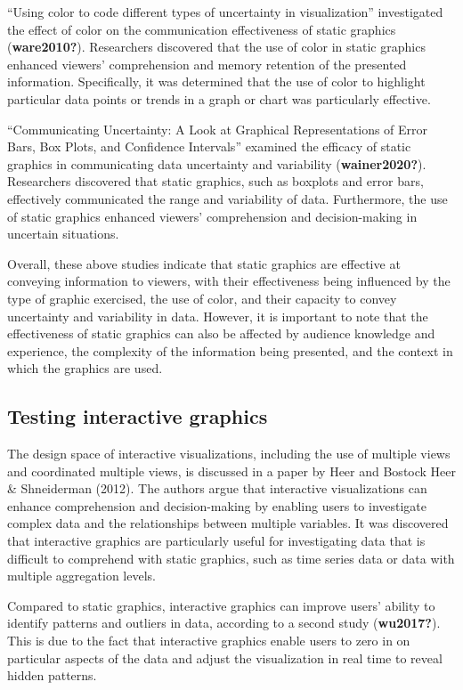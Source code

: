 \documentclass[print]{nuthesis}
\begin{document}
``Using color to code different types of uncertainty in visualization'' investigated the effect of color on the communication effectiveness of static graphics (\textbf{ware2010?}).
Researchers discovered that the use of color in static graphics enhanced viewers' comprehension and memory retention of the presented information.
Specifically, it was determined that the use of color to highlight particular data points or trends in a graph or chart was particularly effective.

``Communicating Uncertainty: A Look at Graphical Representations of Error Bars, Box Plots, and Confidence Intervals'' examined the efficacy of static graphics in communicating data uncertainty and variability (\textbf{wainer2020?}).
Researchers discovered that static graphics, such as boxplots and error bars, effectively communicated the range and variability of data.
Furthermore, the use of static graphics enhanced viewers' comprehension and decision-making in uncertain situations.

Overall, these above studies indicate that static graphics are effective at conveying information to viewers, with their effectiveness being influenced by the type of graphic exercised, the use of color, and their capacity to convey uncertainty and variability in data.
However, it is important to note that the effectiveness of static graphics can also be affected by audience knowledge and experience, the complexity of the information being presented, and the context in which the graphics are used.

\hypertarget{testing-interactive-graphics}{%
\subsection{Testing interactive graphics}\label{testing-interactive-graphics}}

The design space of interactive visualizations, including the use of multiple views and coordinated multiple views, is discussed in a paper by Heer and Bostock Heer \& Shneiderman (2012).
The authors argue that interactive visualizations can enhance comprehension and decision-making by enabling users to investigate complex data and the relationships between multiple variables.
It was discovered that interactive graphics are particularly useful for investigating data that is difficult to comprehend with static graphics, such as time series data or data with multiple aggregation levels.

Compared to static graphics, interactive graphics can improve users' ability to identify patterns and outliers in data, according to a second study (\textbf{wu2017?}).
This is due to the fact that interactive graphics enable users to zero in on particular aspects of the data and adjust the visualization in real time to reveal hidden patterns.
\end{document}
